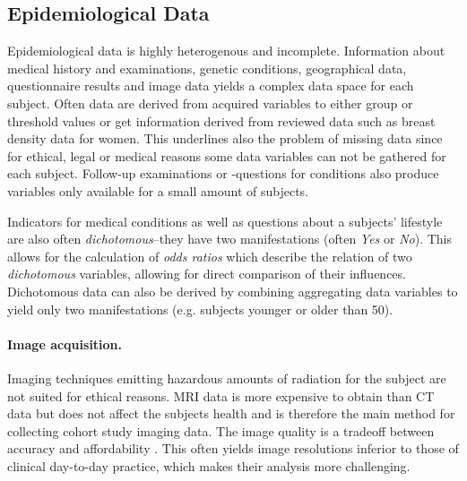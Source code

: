 \documentclass[journal]{style/vgtc} 			          %
\begin{document}
\subsection{Epidemiological Data} \label{EpidemiologicalData}
Epidemiological data is highly heterogenous and incomplete.
%
Information about medical history and examinations, genetic conditions, geographical data, questionnaire results and image data yields a complex data space for each subject.
%
Often data are derived from acquired variables to either group or threshold values or get information derived from reviewed data such as breast density data for women.
%
This underlines also the problem of missing data since for ethical, legal or medical reasons some data variables can not be gathered for each subject.
%
Follow-up examinations or -questions for conditions also produce variables only available for a small amount of subjects.
%

Indicators for medical conditions as well as questions about a subjects' lifestyle are also often \emph{dichotomous}--they have two manifestations (often \emph{Yes} or \emph{No}).
%
This allows for the calculation of \emph{odds ratios} which describe the relation of two \emph{dichotomous} variables, allowing for direct comparison of their influences.
%
Dichotomous data can also be derived by combining aggregating data variables to yield only two manifestations (e.g. subjects younger or older than 50).
%

\paragraph{Image acquisition.} \label{ImageAcquisition} Imaging techniques emitting hazardous amounts of radiation for the subject are not suited for ethical reasons.
%
MRI data is more expensive to obtain than CT data but does not affect the subjects health and is therefore the main method for collecting cohort study imaging data.
%
The image quality is a tradeoff between accuracy and affordability \cite{Preim2014}.
%
This often yields image resolutions inferior to those of clinical day-to-day practice, which makes their analysis more challenging.
\end{document}
